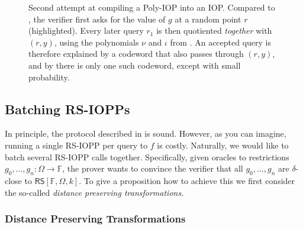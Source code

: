 \documentclass[../../book]{subfiles}
\begin{document}
\begin{figure}[h!]
{%
    }

    \caption{Second attempt at compiling a Poly-IOP into an IOP. Compared to , the verifier first asks for the value of $g$ at a random point $r$ (highlighted). Every later query $r_1$ is then quotiented \emph{together} with $(r, y)$, using the polynomials $\nu$ and $\iota$ from . An accepted query is therefore explained by a codeword that also passes through $(r, y)$, and by  there is only one such codeword, except with small probability.}
    \label{fig:poly-iop-second-attempt}
\end{figure}

\subsection{Batching RS-IOPPs}

In principle, the protocol described in  is sound.
However, as you can imagine, running a single RS-IOPP per query to $f$ is costly.
Naturally, we would like to batch several RS-IOPP calls together.
Specifically, given oracles to restrictions $g_0,\dots,g_n: \Omega \to \mathbb{F}$, the prover wants to convince the verifier that all $g_0,\dots,g_n$ are $\delta$-close to $\mathsf{RS}[\mathbb{F},\Omega,k]$.
To give a proposition how to achieve this we first consider the so-called \emph{distance preserving transformations.}

\subsubsection{Distance Preserving Transformations}
\end{document}

